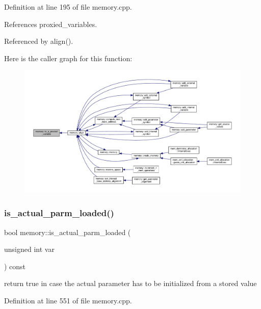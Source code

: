 Definition at line 195 of file memory.\+cpp.



References proxied\+\_\+variables.



Referenced by align().

Here is the caller graph for this function\+:
\nopagebreak
\begin{figure}[H]
\begin{center}
\leavevmode
\includegraphics[width=350pt]{d8/d99/classmemory_ad42c0543068efe731b71267f869fefcf_icgraph}
\end{center}
\end{figure}
\mbox{\label{classmemory_af12efe6e45e237f9db7bdb650121e3b9}} 
\subsubsection{\texorpdfstring{is\+\_\+actual\+\_\+parm\+\_\+loaded()}{is\_actual\_parm\_loaded()}}
{\footnotesize\ttfamily bool memory\+::is\+\_\+actual\+\_\+parm\+\_\+loaded (\begin{DoxyParamCaption}\item[{unsigned int}]{var }\end{DoxyParamCaption}) const}



return true in case the actual parameter has to be initialized from a stored value 



Definition at line 551 of file memory.\+cpp.



